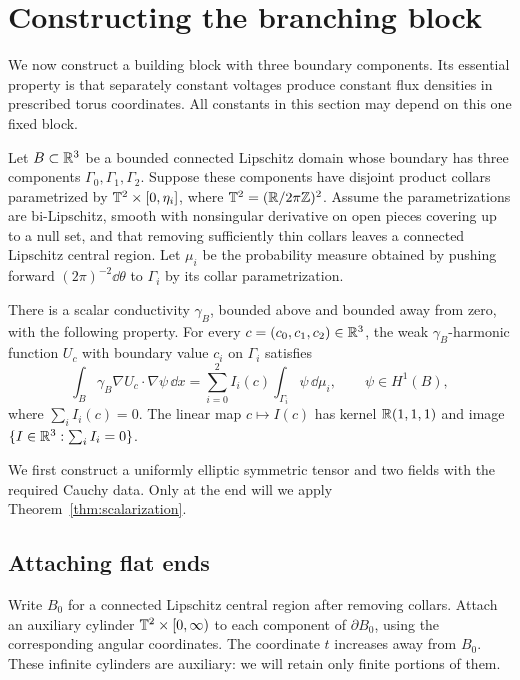 \section{Constructing the branching block}\label{sec:block}

We now construct a building block with three boundary components.  Its
essential property is that separately constant voltages produce constant
flux densities in prescribed torus coordinates.  All constants in this
section may depend on this one fixed block.

\begin{proposition}\label{prop:branching-block}
Let $B\subset\mathbb R^3$ be a bounded connected Lipschitz domain whose boundary
has three components $\Gamma_0,\Gamma_1,\Gamma_2$.  Suppose these components
have disjoint product collars parametrized by
$\mathbb T^2\times[0,\eta_i]$, where $\mathbb T^2=(\mathbb R/2\pi\mathbb Z)^2$.
Assume the parametrizations are bi-Lipschitz, smooth with nonsingular
derivative on open pieces covering up to a null set, and that removing
sufficiently thin collars leaves a connected Lipschitz central region.
Let $\mu_i$ be the probability measure obtained by pushing forward
$(2\pi)^{-2}\dd\theta$ to $\Gamma_i$ by its collar parametrization.

There is a scalar conductivity $\gamma_B$, bounded above and bounded away
from zero, with the following property.  For every $c=(c_0,c_1,c_2)\in\mathbb R^3$,
the weak $\gamma_B$-harmonic function $U_c$ with boundary value $c_i$ on
$\Gamma_i$ satisfies
\begin{equation}\label{bl:constant-flux}
 \int_B\gamma_B\nabla U_c\cdot\nabla\psi\,\dd x
   =\sum_{i=0}^2 I_i(c)\int_{\Gamma_i}\psi\,\dd\mu_i,
 \qquad \psi\in H^1(B),
\end{equation}
where $\sum_i I_i(c)=0$.  The linear map $c\mapsto I(c)$ has kernel
$\mathbb R(1,1,1)$ and image $\{I\in\mathbb R^3:\sum_i I_i=0\}$.
\end{proposition}

We first construct a uniformly elliptic symmetric tensor and two fields
with the required Cauchy data.  Only at the end will we apply
Theorem~\ref{thm:scalarization}.

\subsection{Attaching flat ends}

Write $B_0$ for a connected Lipschitz central region after removing
collars.  Attach an auxiliary cylinder $\mathbb T^2\times[0,\infty)$ to each
component of $\partial B_0$, using the corresponding angular coordinates.
The coordinate $t$ increases away from $B_0$.  These infinite cylinders
are auxiliary: we will retain only finite portions of them.

